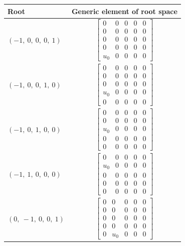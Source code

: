 \documentclass[11pt]{article}
\theoremstyle{definition}
\begin{document}
\noindent \begin{longtable}{|l|c|}
    \hline
    \textbf{Root} & \textbf{Generic element of root space} \\
    \hline
    \endhead
    $\left( -1, \  0, \  0, \  0, \  1\right)$ & ${\left[\begin{matrix}0 & 0 & 0 & 0 & 0\\0 & 0 & 0 & 0 & 0\\0 & 0 & 0 & 0 & 0\\0 & 0 & 0 & 0 & 0\\u_{0} & 0 & 0 & 0 & 0\end{matrix}\right]}$ \\
    \hline
    $\left( -1, \  0, \  0, \  1, \  0\right)$ & ${\left[\begin{matrix}0 & 0 & 0 & 0 & 0\\0 & 0 & 0 & 0 & 0\\0 & 0 & 0 & 0 & 0\\u_{0} & 0 & 0 & 0 & 0\\0 & 0 & 0 & 0 & 0\end{matrix}\right]}$ \\
    \hline
    $\left( -1, \  0, \  1, \  0, \  0\right)$ & ${\left[\begin{matrix}0 & 0 & 0 & 0 & 0\\0 & 0 & 0 & 0 & 0\\u_{0} & 0 & 0 & 0 & 0\\0 & 0 & 0 & 0 & 0\\0 & 0 & 0 & 0 & 0\end{matrix}\right]}$ \\
    \hline
    $\left( -1, \  1, \  0, \  0, \  0\right)$ & ${\left[\begin{matrix}0 & 0 & 0 & 0 & 0\\u_{0} & 0 & 0 & 0 & 0\\0 & 0 & 0 & 0 & 0\\0 & 0 & 0 & 0 & 0\\0 & 0 & 0 & 0 & 0\end{matrix}\right]}$ \\
    \hline
    $\left( 0, \  -1, \  0, \  0, \  1\right)$ & ${\left[\begin{matrix}0 & 0 & 0 & 0 & 0\\0 & 0 & 0 & 0 & 0\\0 & 0 & 0 & 0 & 0\\0 & 0 & 0 & 0 & 0\\0 & u_{0} & 0 & 0 & 0\end{matrix}\right]}$ \\

\end{longtable}
\end{document}
